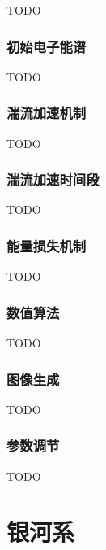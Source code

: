 TODO

\subsubsection{初始电子能谱}

TODO

\subsubsection{湍流加速机制}

TODO

\subsubsection{湍流加速时间段}

TODO

\subsubsection{能量损失机制}

TODO

\subsubsection{数值算法}

TODO

\subsubsection{图像生成}

TODO

\subsubsection{参数调节}

TODO


\section{银河系}


